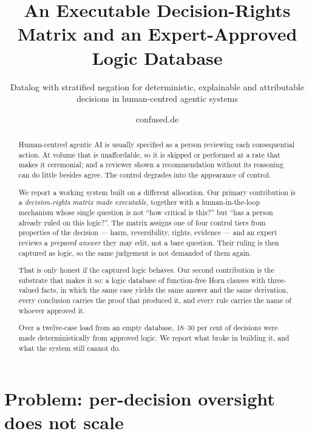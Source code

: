 \documentclass[sigconf,nonacm]{acmart}
\begin{document}
\title{An Executable Decision-Rights Matrix and an Expert-Approved Logic
Database}
\subtitle{Datalog with stratified negation for deterministic, explainable and
attributable decisions in human-centred agentic systems}

\author{confused.de}

\begin{abstract}
Human-centred agentic AI is usually specified as a person reviewing each
consequential action. At volume that is unaffordable, so it is skipped or
performed at a rate that makes it ceremonial; and a reviewer shown a
recommendation without its reasoning can do little besides agree. The control
degrades into the appearance of control.

We report a working system built on a different allocation. Our primary
contribution is a \emph{decision-rights matrix made executable}, together with a
human-in-the-loop mechanism whose single question is not ``how critical is
this?'' but ``has a person already ruled on this logic?''. The matrix assigns one
of four control tiers from properties of the decision --- harm, reversibility,
rights, evidence --- and an expert reviews a \emph{prepared answer} they may
edit, not a bare question. Their ruling is then captured as logic, so the same
judgement is not demanded of them again.

That is only honest if the captured logic behaves. Our second contribution is
the substrate that makes it so: a logic database of function-free Horn clauses
with three-valued facts, in which the same case yields the same answer and the
same derivation, every conclusion carries the proof that produced it, and every
rule carries the name of whoever approved it.

Over a twelve-case load from an empty database, 18--30 per cent of decisions were
made deterministically from approved logic. We report what broke in building it,
and what the system still cannot do.
\end{abstract}

\maketitle

\section{Problem: per-decision oversight does not scale}
\end{document}
